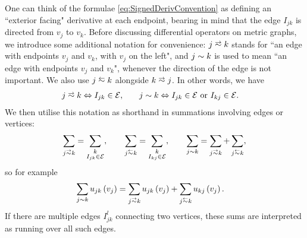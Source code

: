 One can think of the formulae \eqref{eq:SignedDerivConvention} as defining an ``exterior facing" derivative at each endpoint, bearing in mind that the edge $I_{jk}$ is directed from $v_j$ to $v_k$.
Before discussing differential operators on metric graphs, we introduce some additional notation for convenience: $j\conLeft k$ stands for ``an edge with endpoints $v_j$ and $v_k$, with $v_j$ on the left", and $j\sim k$ is used to mean ``an edge with endpoints $v_j$ and $v_k$", whenever the direction of the edge is not important.
We also use $j \conRight k$ alongside $k\conLeft j$.
In other words, we have
\begin{align*}
	j\conLeft k \Leftrightarrow I_{jk}\in \edgeSet, &\qquad
	j\con k \Leftrightarrow I_{jk}\in \edgeSet \text{ or } I_{kj}\in \edgeSet.
\end{align*}
We then utilise this notation as shorthand in summations involving edges or vertices:
\begin{align*}
	\sum_{j\conLeft k} = \sum_{\substack{k \\ I_{jk}\in \edgeSet}}, 
	\qquad 	\sum_{j\conRight k} = \sum_{\substack{k \\ I_{kj}\in \edgeSet}},
	\qquad \sum_{j\con k} = \sum_{j\conLeft k} + \sum_{j\conRight k},
\end{align*}
so for example
\begin{align*}
	\sum_{j\con k}u_{jk}\bracs{v_j} &= \sum_{j\conLeft k}u_{jk}\bracs{v_j} + \sum_{j\conRight k}u_{kj}\bracs{v_j}.
\end{align*}
If there are multiple edges $I_{jk}^l$ connecting two vertices, these sums are interpreted as running over all such edges.

